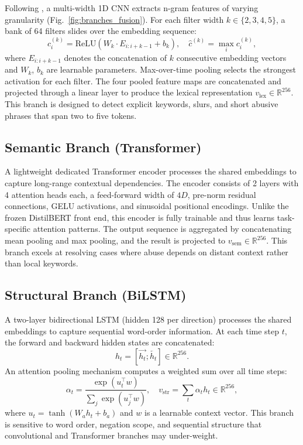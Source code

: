 \documentclass[10pt,twocolumn,a4paper]{article}
\begin{document}
Following \citet{ref7}, a multi-width 1D CNN extracts n-gram features of varying granularity (Fig.~\ref{fig:branches_fusion}). For each filter width $k \in \{2,3,4,5\}$, a bank of 64 filters slides over the embedding sequence:
\begin{equation}
c_i^{(k)} = \mathrm{ReLU}(W_k \cdot E_{i:i+k-1} + b_k), \quad
\hat{c}^{(k)} = \max_i c_i^{(k)},
\label{eq:cnn_bias}
\end{equation}
where $E_{i:i+k-1}$ denotes the concatenation of $k$ consecutive embedding vectors and $W_k$, $b_k$ are learnable parameters. Max-over-time pooling selects the strongest activation for each filter. The four pooled feature maps are concatenated and projected through a linear layer to produce the lexical representation $v_{\mathrm{lex}} \in \mathbb{R}^{256}$. This branch is designed to detect explicit keywords, slurs, and short abusive phrases that span two to five tokens.

\subsection{Semantic Branch (Transformer)}\label{subsec:transformer}

A lightweight dedicated Transformer encoder processes the shared embeddings to capture long-range contextual dependencies. The encoder consists of 2 layers with 4 attention heads each, a feed-forward width of $4D$, pre-norm residual connections, GELU activations, and sinusoidal positional encodings. Unlike the frozen DistilBERT front end, this encoder is fully trainable and thus learns task-specific attention patterns. The output sequence is aggregated by concatenating mean pooling and max pooling, and the result is projected to $v_{\mathrm{sem}} \in \mathbb{R}^{256}$. This branch excels at resolving cases where abuse depends on distant context rather than local keywords.

\subsection{Structural Branch (BiLSTM)}\label{subsec:bilstm}

A two-layer bidirectional LSTM (hidden 128 per direction) \citep{ref8} processes the shared embeddings to capture sequential word-order information. At each time step $t$, the forward and backward hidden states are concatenated:
\begin{equation}
h_t = [\overrightarrow{h_t}; \overleftarrow{h_t}] \in \mathbb{R}^{256}.
\end{equation}
An attention pooling mechanism \citep{ref30} computes a weighted sum over all time steps:
\begin{equation}
\alpha_t = \frac{\exp(u_t^\top w)}{\sum_j \exp(u_j^\top w)}, \quad
v_{\mathrm{str}} = \textstyle\sum_t \alpha_t h_t \in \mathbb{R}^{256},
\end{equation}
where $u_t = \tanh(W_a h_t + b_a)$ and $w$ is a learnable context vector. This branch is sensitive to word order, negation scope, and sequential structure that convolutional and Transformer branches may under-weight.
\end{document}
